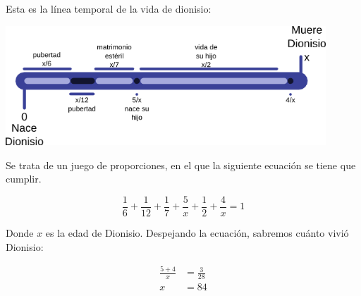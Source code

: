 Esta es la línea temporal de la vida de dionisio:

\begin{center}
  \includegraphics[width=0.9\textwidth]{img/dionisio-lifetime.png}
\end{center}

Se trata de un juego de proporciones, en el que la siguiente ecuación se tiene que cumplir.

\begin{equation*}
  \frac{1}{6} + \frac{1}{12} + \frac{1}{7} + \frac{5}{x} + \frac{1}{2} + \frac{4}{x} = 1
\end{equation*}

Donde $x$ es la edad de Dionisio. Despejando la ecuación, sabremos cuánto vivió Dionisio:

\begin{align*}
  \frac{5+4}{x} &= \frac{3}{28} \\
  x &= 84
\end{align*}

